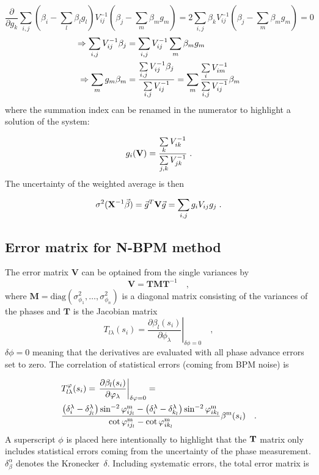 \[\frac{\partial}{\partial g_k}\sum\limits_{i,j} \left(\beta_i - \sum_l\beta_lg_l\right) V_{ij}^{-1} \left(\beta_j-\sum_m\beta_mg_m\right) = 2\sum_{i,j}\beta_kV_{ij}^{-1}\left(\beta_j - \sum_m\beta_mg_m\right) = 0\]
\begin{align}
\Rightarrow \sum_{i,j}V_{ij}^{-1}\beta_j&=\sum_{i,j}V_{ij}^{-1}\sum_m\beta_mg_m\notag \\
\Rightarrow\sum_mg_m\beta_m &= \frac{\sum\limits_{i,j}V_{ij}^{-1}\beta_j}{\sum\limits_{i,j}V_{ij}^{-1}}=\sum_m \frac{\sum\limits_i V_{im}^{-1}}{\sum\limits_{i,j}V_{ij}^{-1}}\beta_m
\end{align} where the summation index can be renamed in the numerator to highlight a solution of the system:

\begin{equation}
g_i(\mathbf{V}) = \frac{\sum\limits_k V_{ik}^{-1}}{\sum\limits_{j,k}V_{jk}^{-1}}\; .
\end{equation}
The uncertainty of the weighted average is then

\begin{equation}
\sigma^2(\mathbf{X}^{-1}\vec{\beta}) = \vec{g}^T\mathbf{V}\vec{g} = \sum\limits_{i,j}g_iV_{ij}g_j\;.
\end{equation}

\subsection{Error matrix for N-BPM method}

The error matrix $ \mathbf{V} $ can be optained from the single variances by
\begin{equation}
\mathbf{V} = \mathbf{T}\mathbf{M}\mathbf{T}^{-1}\quad ,
\label{eq:V}
\end{equation}
where $ \mathbf{M}=\text{diag}(\sigma^2_{\phi_1}, \ldots, \sigma^2_{\phi_n}) $ is a diagonal matrix consisting of the variances of the phases and $ \mathbf{T} $ is the Jacobian matrix
\begin{equation}
T_{l\lambda}(s_i) = \left.\frac{\partial \beta_l(s_i)}{\partial \phi_\lambda} \right|_{\delta\phi=0}\quad ,
\label{eq:Tij}
\end{equation}
$ \delta\phi=0 $ meaning that the derivatives are evaluated with all phase advance errors set to zero. The correlation of statistical errors (coming from BPM noise) is

\begin{align}
&T_{l\lambda}^\varphi(s_i) = \left.\frac{\partial \beta_l(s_i)}{\partial \varphi_\lambda}\right|_{\delta \varphi =0} =\notag\\ 
&\frac{
		\left(\delta_{i}^\lambda-\delta_{j_l}^\lambda\right)\sin^{-2}\varphi^\text{m}_{i{j_l}} -
		\left(\delta_{i}^\lambda-\delta_{k_l}^\lambda\right)\sin^{-2}\varphi_{i{k_l}}^\text{m}
	}
	{
		\cot \varphi_{i{j_l}}^\text{m} - \cot\varphi_{i{k_l}}^\text{m}
	}
\beta^\text{m}(s_i)\quad .
\label{eq:Tphiij}
\end{align}  
A superscript $ \phi $ is placed here intentionally to highlight that the $ \mathbf{T} $ matrix only includes statistical errors coming from the uncertainty of the phase measurement. $\delta^\alpha_\beta $ denotes the Kronecker~$\delta$. Including systematic errors, the total error matrix is

